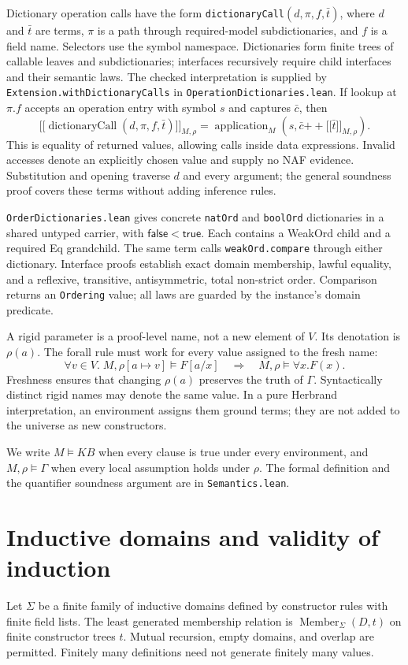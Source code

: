 \documentclass[11pt]{article}
\newcommand{\KB}{\mathit{KB}}
\begin{document}
Dictionary operation calls have the form
\texttt{dictionaryCall}$(d,\pi,f,\bar t)$, where $d$ and $\bar t$ are terms,
$\pi$ is a path through required-model subdictionaries, and $f$ is a field name.
Selectors use the symbol namespace. Dictionaries form finite trees of callable
leaves and subdictionaries; interfaces recursively require child interfaces and
their semantic laws. The checked interpretation is supplied by
\texttt{Extension.withDictionaryCalls} in \texttt{OperationDictionaries.lean}.
If lookup at $\pi.f$ accepts an operation entry with symbol $s$ and captures $\bar c$,
then
\[
 \lbrack\!\lbrack\operatorname{dictionaryCall}(d,\pi,f,\bar t)\rbrack\!\rbrack_{M,\rho}
 =\operatorname{application}_M
   (s,\bar c\mathbin{+\!+}\lbrack\!\lbrack\bar t\rbrack\!\rbrack_{M,\rho}).
\]
This is equality of returned values, allowing calls inside data expressions.
Invalid accesses denote an explicitly chosen value and supply no NAF evidence.
Substitution and opening traverse $d$ and every argument; the general soundness
proof covers these terms without adding inference rules.

\texttt{OrderDictionaries.lean} gives concrete \texttt{natOrd} and
\texttt{boolOrd} dictionaries in a shared untyped carrier, with $\mathsf{false}<\mathsf{true}$.
Each contains a WeakOrd child and a required Eq grandchild. The same term calls
\texttt{weakOrd.compare} through either dictionary. Interface proofs establish
exact domain membership, lawful equality, and a reflexive, transitive,
antisymmetric, total non-strict order. Comparison returns an \texttt{Ordering}
value; all laws are guarded by the instance's domain predicate.

A rigid parameter is a proof-level name, not a new element of $V$.
Its denotation is $\rho(a)$. The forall rule must work for every value assigned
to the fresh name:
\[
 \forall v\in V.\;M,\rho[a\mapsto v]\models F[a/x]
 \quad\Longrightarrow\quad M,\rho\models\forall x.F(x).
\]
Freshness ensures that changing $\rho(a)$ preserves the truth of $\Gamma$.
Syntactically distinct rigid names may denote the same value. In a pure Herbrand
interpretation, an environment assigns them ground terms; they are not added
to the universe as new constructors.

We write $M\models\KB$ when every clause is true under every environment,
and $M,\rho\models\Gamma$ when every local assumption holds under $\rho$.
The formal definition and the quantifier soundness argument are in
\texttt{Semantics.lean}.

\section{Inductive domains and validity of induction}
Let $\Sigma$ be a finite family of inductive domains defined by constructor
rules with finite field lists. The least generated membership relation is
$\operatorname{Member}_\Sigma(D,t)$ on finite constructor trees $t$.
Mutual recursion, empty domains, and overlap are permitted. Finitely many
definitions need not generate finitely many values.
\end{document}

